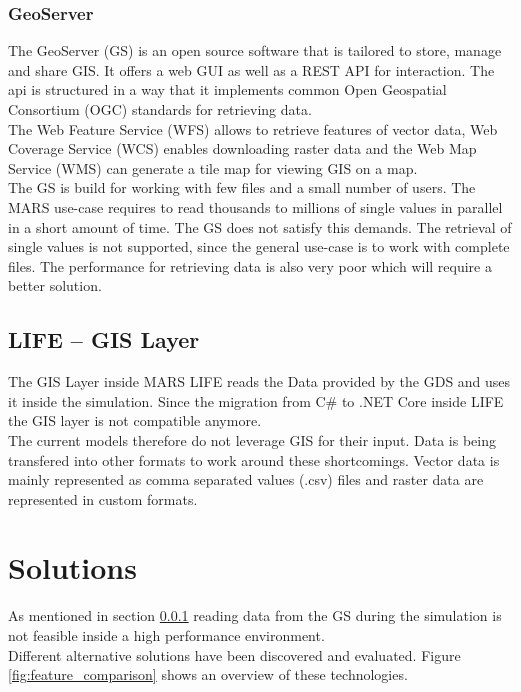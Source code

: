 \subsubsection{GeoServer} \label{sec:GS}
The GeoServer (GS) is an open source software that is tailored to store, manage and share GIS. It offers a web GUI as well as a REST API for interaction. The api is structured in a way that it implements common Open Geospatial Consortium (OGC) standards for retrieving data.\\
The Web Feature Service (WFS) allows to retrieve features of vector data, Web Coverage Service (WCS) enables downloading raster data and the Web Map Service (WMS) can generate a tile map for viewing GIS on a map.\\
The GS is build for working with few files and a small number of users. The MARS use-case requires to read thousands to millions of  single values in parallel in a short amount of time. The GS does not satisfy this demands. The retrieval of single values is not supported, since the general use-case is to work with complete files. The performance for retrieving data is also very poor which will require a better solution.


\subsection{LIFE -- GIS Layer}
The GIS Layer inside MARS LIFE reads the Data provided by the GDS and uses it inside the simulation. Since the migration from C\# to .NET Core inside LIFE the GIS layer is not compatible anymore.\\
The current models therefore do not leverage GIS for their input. Data is being transfered into other formats to work around these shortcomings. Vector data is mainly represented as comma separated values (.csv) files and raster data are represented in custom formats.


\section{Solutions}
As mentioned in section \ref{sec:GS} reading data from the GS during the simulation is not feasible inside a high performance environment.\\
Different alternative solutions have been discovered and evaluated. Figure \ref{fig:feature_comparison} shows an overview of these technologies.

